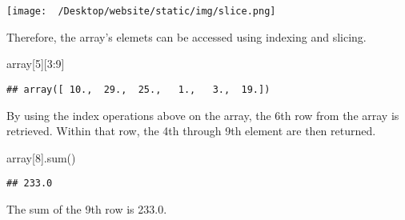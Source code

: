 \documentclass[]{article}
\newenvironment{Shaded}{\begin{snugshade}}{\end{snugshade}}
\newcommand{\BuiltInTok}[1]{#1}
\newcommand{\DecValTok}[1]{\textcolor[rgb]{0.00,0.00,0.81}{#1}}
\newcommand{\NormalTok}[1]{#1}
\begin{document}
\texttt{[image: ~/Desktop/website/static/img/slice.png]}

Therefore, the array's elemets can be accessed using indexing and
slicing.

\begin{Shaded}
\begin{Highlighting}[]
\NormalTok{array[}\DecValTok{5}\NormalTok{][}\DecValTok{3}\NormalTok{:}\DecValTok{9}\NormalTok{]}
\end{Highlighting}
\end{Shaded}

\begin{verbatim}
## array([ 10.,  29.,  25.,   1.,   3.,  19.])
\end{verbatim}

By using the index operations above on the array, the 6th row from the
array is retrieved. Within that row, the 4th through 9th element are
then returned.

\begin{Shaded}
\begin{Highlighting}[]
\NormalTok{array[}\DecValTok{8}\NormalTok{].}\BuiltInTok{sum}\NormalTok{()}
\end{Highlighting}
\end{Shaded}

\begin{verbatim}
## 233.0
\end{verbatim}

The sum of the 9th row is 233.0.
\end{document}
